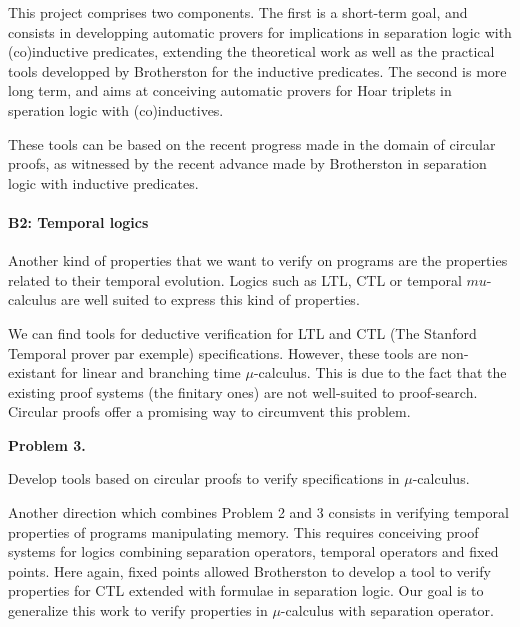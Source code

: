 \documentclass[11pt,twocolumn]{article}
\begin{document}
This project comprises two components. The first is a short-term goal, and consists in developping automatic provers
for implications in separation logic with (co)inductive predicates, extending the theoretical work as well as the practical tools developped by Brotherston for the inductive predicates. The second is more long term, and aims at conceiving automatic provers for Hoar triplets in speration logic with (co)inductives.

These tools can be based on the recent progress made in the domain of circular proofs, as witnessed  by the recent advance made by Brotherston in separation logic with inductive predicates.


\paragraph{B2: Temporal logics}

Another kind of properties that we want to verify on programs are the properties related to their temporal evolution. Logics such as LTL, CTL or temporal $mu$-calculus are well suited to express this kind of properties.

We can find tools for deductive verification for LTL and CTL (The Stanford Temporal prover par exemple) specifications. However, these tools are non-existant for linear and branching time $\mu$-calculus. This is due to the fact that the existing proof systems (the finitary ones) are not well-suited to proof-search. Circular proofs offer a promising way to circumvent this problem.


\begin{center}
\begin{bclogo}[logo= ,arrondi = 0.1, couleur = green!10,  epBarre = 0]{}
  \vspace{-10pt}
  \textbf{Problem 3.}

  Develop tools based on circular proofs to verify specifications in $\mu$-calculus.
\end{bclogo}
\end{center}
Another direction which combines Problem 2 and 3 consists in verifying temporal properties of programs manipulating memory. This requires conceiving proof systems for logics combining separation operators, temporal operators and fixed points. Here again, fixed points allowed Brotherston to develop a tool  \cite{TellezB17} to verify properties for CTL extended with formulae in separation logic. Our goal is to generalize this work to verify properties in $\mu$-calculus with separation operator.
\end{document}
